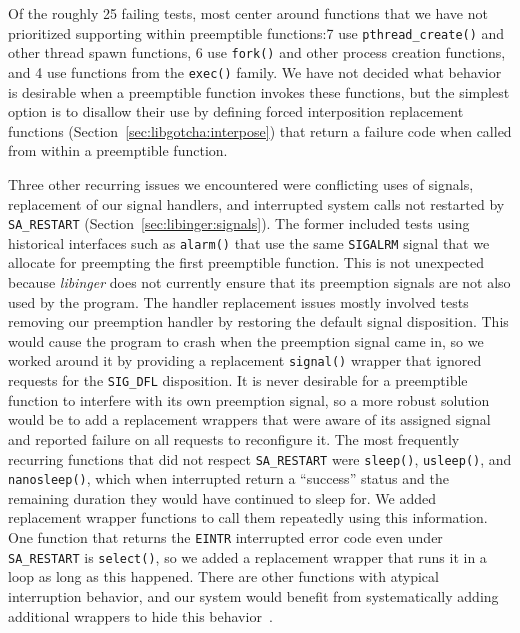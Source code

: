 Of the roughly 25 failing tests, most center around functions that we have not
prioritized supporting within preemptible functions:\@ 7 use
\texttt{pthread\_create()} and other thread spawn functions, 6 use \texttt{fork()}
and other process creation functions, and 4 use functions from the \texttt{exec()}
family.  We have not decided what behavior is desirable when a preemptible function
invokes these functions, but the simplest option is to disallow their use by defining
forced interposition replacement functions (Section~\ref{sec:libgotcha:interpose})
that return a failure code when called from within a preemptible function.

Three other recurring issues we encountered were conflicting uses of signals,
replacement of our signal handlers, and interrupted system calls not restarted by
\texttt{SA\_RESTART} (Section~\ref{sec:libinger:signals}).  The former included tests
using historical interfaces such as \texttt{alarm()} that use the same
\texttt{SIGALRM} signal that we allocate for preempting the first preemptible
function.  This is not unexpected because \textit{libinger} does not currently ensure
that its preemption signals are not also used by the program.  The handler
replacement issues mostly involved tests removing our preemption handler by restoring
the default signal disposition.  This would cause the program to crash when the
preemption signal came in, so we worked around it by providing a replacement
\texttt{signal()} wrapper that ignored requests for the \texttt{SIG\_DFL}
disposition.  It is never desirable for a preemptible function to interfere with its
own preemption signal, so a more robust solution would be to add a replacement
wrappers that were aware of its assigned signal and reported failure on all requests
to reconfigure it.  The most frequently recurring functions that did not respect
\texttt{SA\_RESTART} were \texttt{sleep()}, \texttt{usleep()}, and
\texttt{nanosleep()}, which when interrupted return a ``success'' status and the
remaining duration they would have continued to sleep for.  We added replacement
wrapper functions to call them repeatedly using this information.  One function that
returns the \texttt{EINTR} interrupted error code even under \texttt{SA\_RESTART} is
\texttt{select()}, so we added a replacement wrapper that runs it in a loop as long as
this happened.  There are other functions with atypical interruption behavior, and
our system would benefit from systematically adding additional wrappers to hide this
behavior~\cite{signal-manpage}.

